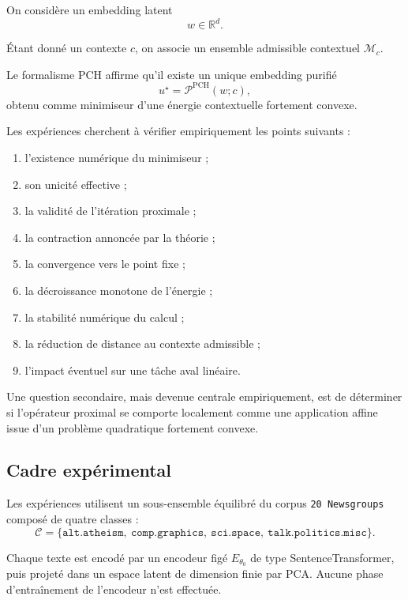 \documentclass[11pt,a4paper]{article}
\newcommand{\1}{\mathbf 1}
\begin{document}
On considère un embedding latent
\[
w \in \mathbb R^d.
\]

Étant donné un contexte \(c\), on associe un ensemble admissible contextuel \(\mathcal M_c\).

Le formalisme PCH affirme qu’il existe un unique embedding purifié
\[
u^\star = \mathcal P^{\mathrm{PCH}}(w;c),
\]
obtenu comme minimiseur d’une énergie contextuelle fortement convexe.

Les expériences cherchent à vérifier empiriquement les points suivants :
\begin{enumerate}[leftmargin=2em]
    \item l’existence numérique du minimiseur ;
    \item son unicité effective ;
    \item la validité de l’itération proximale ;
    \item la contraction annoncée par la théorie ;
    \item la convergence vers le point fixe ;
    \item la décroissance monotone de l’énergie ;
    \item la stabilité numérique du calcul ;
    \item la réduction de distance au contexte admissible ;
    \item l’impact éventuel sur une tâche aval linéaire.
\end{enumerate}

Une question secondaire, mais devenue centrale empiriquement, est de déterminer si l’opérateur proximal se comporte localement comme une application affine issue d’un problème quadratique fortement convexe.

\subsection{Cadre expérimental}

Les expériences utilisent un sous-ensemble équilibré du corpus \texttt{20 Newsgroups} composé de quatre classes :
\[
\mathcal C =
\{\texttt{alt.atheism},\ \texttt{comp.graphics},\ \texttt{sci.space},\ \texttt{talk.politics.misc}\}.
\]

Chaque texte est encodé par un encodeur figé \(E_{\theta_0}\) de type SentenceTransformer, puis projeté dans un espace latent de dimension finie par PCA. Aucune phase d’entraînement de l’encodeur n’est effectuée.
\end{document}
